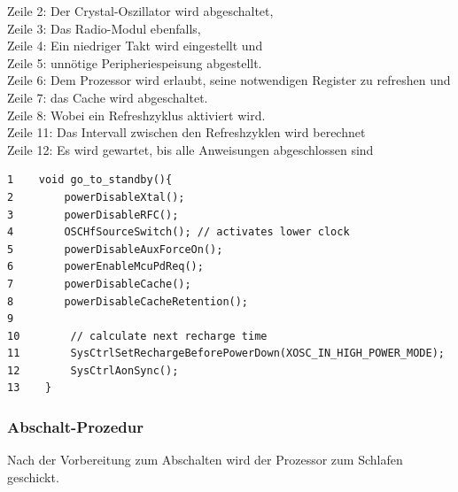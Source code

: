 Zeile 2:\hspace{1cm}   Der Crystal-Oszillator wird abgeschaltet,\\
Zeile 3:\hspace{1cm}   Das Radio-Modul ebenfalls,\\ 
Zeile 4:\hspace{1cm}   Ein niedriger Takt wird eingestellt und\\ 
Zeile 5:\hspace{1cm}   unnötige Peripheriespeisung abgestellt.\\ 
Zeile 6:\hspace{1cm}   Dem Prozessor wird erlaubt, seine notwendigen Register zu refreshen und\\ 
Zeile 7:\hspace{1cm}   das Cache wird abgeschaltet.\\ 
Zeile 8:\hspace{1cm}   Wobei ein Refreshzyklus aktiviert wird.\\
Zeile 11:\hspace{1cm}  Das Intervall zwischen den Refreshzyklen wird berechnet\\
Zeile 12:\hspace{1cm}  Es wird gewartet, bis alle Anweisungen abgeschlossen sind\\



\begin{minipage}[t]{1\textwidth}
\small\begin{verbatim}
1    void go_to_standby(){ 
2        powerDisableXtal();
3        powerDisableRFC();
4        OSCHfSourceSwitch(); // activates lower clock
5        powerDisableAuxForceOn();
6        powerEnableMcuPdReq();
7        powerDisableCache();
8        powerDisableCacheRetention();
9
10        // calculate next recharge time
11        SysCtrlSetRechargeBeforePowerDown(XOSC_IN_HIGH_POWER_MODE);
12        SysCtrlAonSync();
13    } 
    \end{verbatim}\normalsize
\end{minipage} 	    

\subsubsection{Abschalt-Prozedur}
\label{ausschalten}

Nach der Vorbereitung zum Abschalten wird der Prozessor zum Schlafen geschickt.\\

